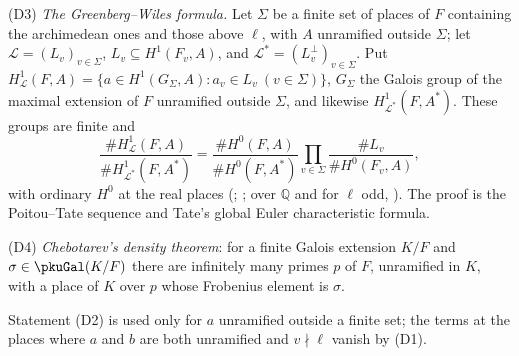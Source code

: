 \documentclass[10pt]{amsart}
\theoremstyle{definition}
\theoremstyle{remark}
\newcommand{\Q}{\mathbb Q}
\begin{document}
\smallskip\noindent(D3) \emph{The Greenberg--Wiles formula.} Let $\Sigma$ be a finite set of places of
$F$ containing the archimedean ones and those above $\ell$, with $A$ unramified outside $\Sigma$; let
$\mathcal L=(L_v)_{v\in\Sigma}$, $L_v\subseteq H^1(F_v,A)$, and $\mathcal L^*=(L_v^\perp)_{v\in\Sigma}$.
Put $H^1_{\mathcal L}(F,A)=\{a\in H^1(G_\Sigma,A):a_v\in L_v\ (v\in\Sigma)\}$, $G_\Sigma$ the Galois
group of the maximal extension of $F$ unramified outside $\Sigma$, and likewise $H^1_{\mathcal L^*}(F,
A^*)$. These groups are finite and
\begin{equation}\label{pku:eq-GW}
\frac{\#H^1_{\mathcal L}(F,A)}{\#H^1_{\mathcal L^*}(F,A^*)}=\frac{\#H^0(F,A)}{\#H^0(F,A^*)}
\prod_{v\in\Sigma}\frac{\#L_v}{\#H^0(F_v,A)} ,
\end{equation}
with ordinary $H^0$ at the real places (\cite[Theorem~2.19]{DDT}; \cite[Theorem~8.7.9]{NSW}; over $\Q$ and for $\ell$ odd, \cite[Proposition~1.6]{WilesFLT}). The proof is the Poitou--Tate sequence and Tate's global Euler
characteristic formula.

\smallskip\noindent(D4) \emph{Chebotarev's density theorem}: for a finite Galois extension $K/F$ and
$\sigma\in\pkuGal(K/F)$ there are infinitely many primes $p$ of $F$, unramified in $K$, with a place
of $K$ over $p$ whose Frobenius element is $\sigma$.

\smallskip
Statement (D2) is used only for $a$ unramified outside a finite set; the terms at the places where
$a$ and $b$ are both unramified and $v\nmid\ell$ vanish by (D1).
\end{document}
